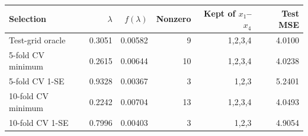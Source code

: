 \begin{center}
\small
\setlength{\tabcolsep}{4pt}
\begin{tabular}{lrrrrr}
\toprule
Selection & $\lambda$ & $f(\lambda)$ & Nonzero & Kept of $x_1$--$x_4$ & Test MSE \\
\midrule
Test-grid oracle & 0.3051 & 0.00582 & 9 & 1,2,3,4 & 4.0100 \\
5-fold CV minimum & 0.2615 & 0.00644 & 10 & 1,2,3,4 & 4.0238 \\
5-fold CV 1-SE & 0.9328 & 0.00367 & 3 & 1,2,3 & 5.2401 \\
10-fold CV minimum & 0.2242 & 0.00704 & 13 & 1,2,3,4 & 4.0493 \\
10-fold CV 1-SE & 0.7996 & 0.00403 & 3 & 1,2,3 & 4.9054 \\
\bottomrule
\end{tabular}
\end{center}
